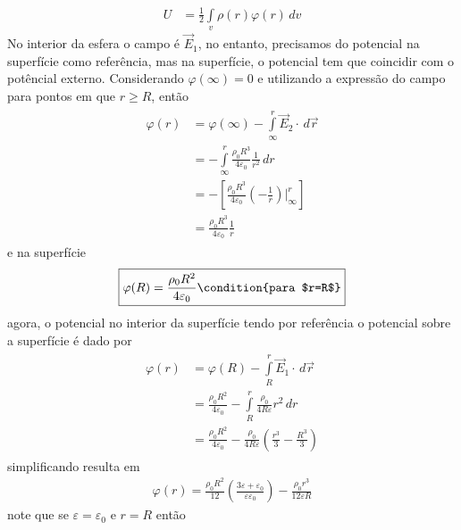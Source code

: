 \begin{prob}
\begin{sol}
\begin{enumerate}[label=\alph *)]
				\begin{align}
					\label{eq:autoenergia-01}
					U &= \frac{1}{2}\int\limits_{v} \rho(r) \varphi(r)\,d{v}	
				\end{align}
				No interior da esfera o campo é $\vec{E}_{1}$, no entanto, precisamos do potencial na superfície como referência, mas na superfície, o potencial tem que coincidir com o potêncial externo. Considerando $\varphi(\infty)=0$ e utilizando a expressão do campo para pontos em que $r\geq R$, então
				\begin{align}
					\begin{split}
						\varphi(r) &= \varphi(\infty) - \int\limits_{\infty}^{r}\vec{E}_{2}\cdot\,d{\vec{r}}\\
											 &= -\int\limits_{\infty}^{r}\frac{\rho_0 R^{3}}{4 \varepsilon_0}\frac{1}{r^{2}}\,d{r}\\
											 &= -\left[\frac{\rho_0 R^{3}}{4 \varepsilon_0}\left(-\frac{1}{r}\right)\Bigg|_{\infty}^{r}\right]\\
											 &= \frac{\rho_0 R^{3}}{4 \varepsilon_0}\frac{1}{r}
					\end{split}
				\end{align}
				e na superfície
				\begin{align}
					\boxed{
						\varphi(R)=\frac{\rho_0 R^{2}}{4 \varepsilon_0}\condition{para $r=R$}
					}
				\end{align}
				agora, o potencial no interior da superfície tendo por referência o potencial sobre a superfície é dado por
				\begin{align}
					\begin{split}
						\varphi(r) &= \varphi(R)-\int\limits_{R}^{r}\vec{E}_1\cdot\,d{\vec{r}}\\
											 &= \frac{\rho_0 R^{2}}{4 \varepsilon_0}-\int\limits_{R}^{r}\frac{\rho_0}{4R \varepsilon}r^{2}\,d{r}\\
											 &= \frac{\rho_0 R^{2}}{4 \varepsilon_0}-\frac{\rho_0}{4R \varepsilon}\left(\frac{r^{3}}{3}-\frac{R^{3}}{3}\right)
					\end{split}
				\end{align}
				simplificando resulta em
				\begin{align}
					\boxed{
						\varphi(r)=\frac{\rho_0 R^{2}}{12}\left(\frac{3 \varepsilon+ \varepsilon_0}{\varepsilon \varepsilon_0}\right)-\frac{\rho_0 r^{3}}{12 \varepsilon R}
					}	
				\end{align}
				note que se $\varepsilon=\varepsilon_0$ e $r=R$ então
				\begin{align}

\end{align}
\end{enumerate}
\end{sol}
\end{prob}
